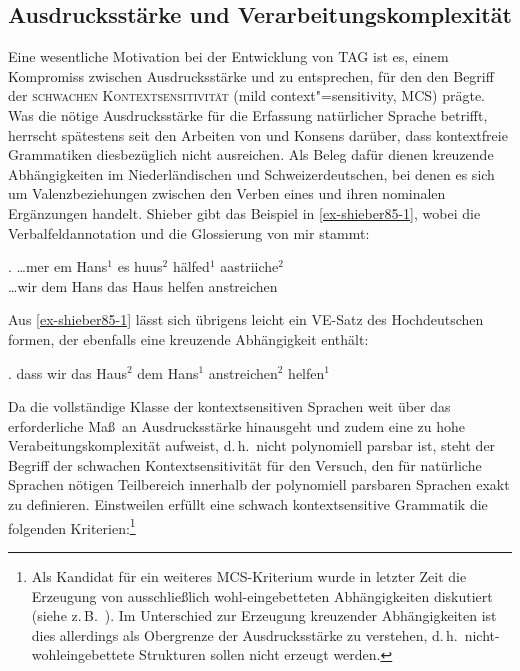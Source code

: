 \subsection{Ausdrucksstärke und Verarbeitungskomplexität}\label{sec:ausdrucksstaerke}

Eine wesentliche Motivation bei der Entwicklung von TAG ist es, einem Kompromiss zwischen Ausdrucksstärke und  zu entsprechen, für den \cite{Joshi:85} den Begriff der \textsc{schwachen Kontextsensitivität} (mild context"=sensitivity, MCS) prägte. Was die nötige Ausdrucksstärke für die Erfassung natürlicher Sprache betrifft, herrscht spätestens seit den Arbeiten von \cite{Huybrechts:84} und \cite{Shieber:85} Konsens darüber, dass kontextfreie Grammatiken diesbezüglich nicht ausreichen. Als Beleg dafür dienen kreuzende Abhängigkeiten im Niederländischen und Schweizerdeutschen, bei denen es sich um Valenzbeziehungen zwischen den Verben eines  und ihren nominalen Ergänzungen handelt. Shieber gibt das Beispiel in \ref{ex-shieber85-1}, wobei die Verbalfeldannotation und die Glossierung von mir stammt:

\exg. \label{ex-shieber85-1}\ldots mer {em Hans$^1$} {es huus$^2$} hälfed$^1$ aastriiche$^2$ \\
\ldots wir {dem Hans} {das Haus} helfen anstreichen {~}\\
\citep[(1)]{Shieber:85}

Aus \ref{ex-shieber85-1} lässt sich übrigens leicht ein VE-Satz des Hochdeutschen formen, der ebenfalls eine kreuzende Abhängigkeit enthält:

\ex. dass wir das Haus$^2$ dem Hans$^1$ anstreichen$^2$ helfen$^1$

\newpage
Da die vollständige Klasse der kontextsensitiven Sprachen weit über das erforderliche Ma\ss \ an Ausdrucksstärke hinausgeht und zudem eine zu hohe Verabeitungskomplexität aufweist, d.\,h.\ nicht polynomiell parsbar ist, steht der Begriff der schwachen Kontextsensitivität für den Versuch, den für natürliche Sprachen nötigen Teilbereich innerhalb der polynomiell parsbaren Sprachen exakt zu definieren.  Einstweilen erfüllt eine schwach kontextsensitive Grammatik die folgenden Kriterien:\footnote{Als Kandidat für ein weiteres MCS-Kriterium wurde in letzter Zeit die Erzeugung von ausschlie\ss lich wohl-eingebetteten Abhängigkeiten diskutiert (siehe z.\,B.\ \citealt{Kuhlmann:Moehl:07, Kanazawa:09, Moennich:10}). Im Unterschied zur Erzeugung kreuzender Abhängigkeiten ist dies allerdings als Obergrenze der Ausdrucksstärke zu verstehen, d.\,h.\ nicht-wohleingebettete Strukturen sollen nicht erzeugt werden.}

